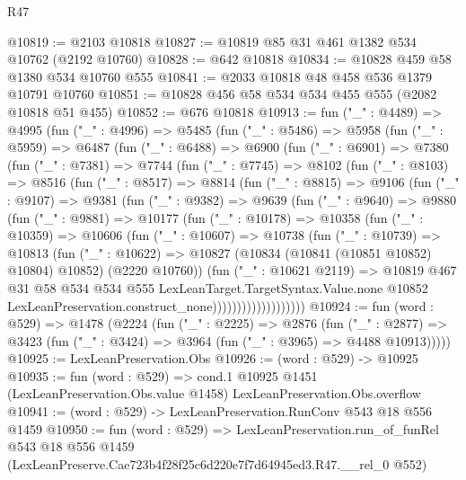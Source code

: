 \begin{lexlean}{R47}
\begin{coremodule}
@10819 := @2103 @10818
@10827 := @10819 @85 @31 @461 @1382 @534 @10762 (@2192 @10760)
@10828 := @642 @10818
@10834 := @10828 @459 @58 @1380 @534 @10760 @555
@10841 := @2033 @10818 @48 @458 @536 @1379 @10791 @10760
@10851 := @10828 @456 @58 @534 @534 @455 @555 (@2082 @10818 @51 @455)
@10852 := @676 @10818
@10913 := fun ("_" : @4489) =>
  @4995
    (fun ("_" : @4996) =>
    @5485
      (fun ("_" : @5486) =>
      @5958
        (fun ("_" : @5959) =>
        @6487
          (fun ("_" : @6488) =>
          @6900
            (fun ("_" : @6901) =>
            @7380
              (fun ("_" : @7381) =>
              @7744
                (fun ("_" : @7745) =>
                @8102
                  (fun ("_" : @8103) =>
                  @8516
                    (fun ("_" : @8517) =>
                    @8814
                      (fun ("_" : @8815) =>
                      @9106
                        (fun ("_" : @9107) =>
                        @9381
                          (fun ("_" : @9382) =>
                          @9639
                            (fun ("_" : @9640) =>
                            @9880
                              (fun ("_" : @9881) =>
                              @10177
                                (fun ("_" : @10178) =>
                                @10358
                                  (fun ("_" : @10359) =>
                                  @10606
                                    (fun ("_" : @10607) =>
                                    @10738
                                      (fun ("_" : @10739) =>
                                      @10813
                                        (fun ("_" : @10622) =>
                                        @10827
                                          (@10834 (@10841 (@10851 @10852) @10804) @10852)
                                          (@2220 @10760))
                                        (fun ("_" : @10621 @2119) =>
                                        @10819
                                          @467
                                          @31
                                          @58
                                          @534
                                          @534
                                          @555
                                          LexLeanTarget.TargetSyntax.Value.none
                                          @10852
                                          LexLeanPreservation.construct_none)))))))))))))))))))
@10924 := fun (word : @529) =>
  @1478
    (@2224
      (fun ("_" : @2225) =>
      @2876
        (fun ("_" : @2877) =>
        @3423 (fun ("_" : @3424) => @3964 (fun ("_" : @3965) => @4488 @10913)))))
@10925 := LexLeanPreservation.Obs
@10926 := (word : @529) -> @10925
@10935 := fun (word : @529) =>
  cond.{1} @10925 @1451 (LexLeanPreservation.Obs.value @1458) LexLeanPreservation.Obs.overflow
@10941 := (word : @529) -> LexLeanPreservation.RunConv @543 @18 @556 @1459
@10950 := fun (word : @529) =>
  LexLeanPreservation.run_of_funRel
    @543
    @18
    @556
    @1459
    (LexLeanPreserve.Cae723b4f28f25c6d220e7f7d64945ed3.R47.__rel_0 @552)
\end{coremodule}
\end{lexlean}
